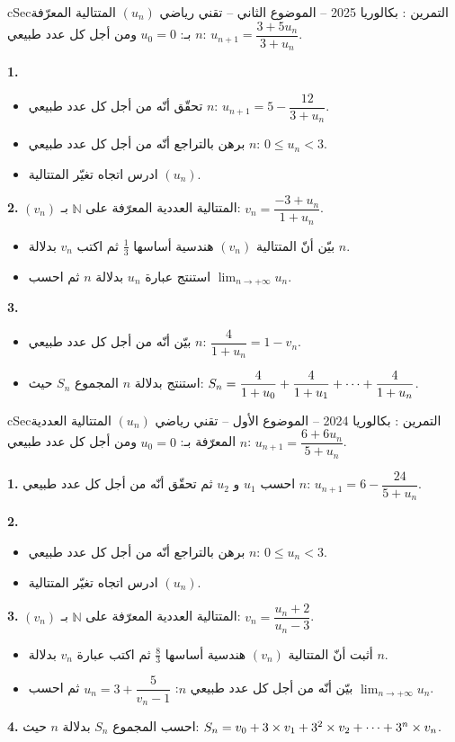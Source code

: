 \documentclass[12pt,a4paper]{article}
\newenvironment{BOX}[2]{\begin{otherlanguage}{english}\begin{arbox}{#1}{#2}}{\end{arbox}\end{otherlanguage}}
\newcounter{exo}
\newenvironment{tamrin}[1]{\stepcounter{exo}\begin{BOX}{cSec}{التمرين \theexo: #1}}{\end{BOX}}
\renewcommand{\cdots}{\mathinner{\cdotp\cdotp\cdotp}}
\newcommand{\N}{\mathbb{N}}
\newcommand{\limn}{\displaystyle\lim_{n\to+\infty}}
\newenvironment{sq}{\begin{itemize}[leftmargin=2.4em,itemsep=3pt]}{\end{itemize}}
\newcommand{\qa}{\item[(أ)]}\newcommand{\qb}{\item[(ب)]}\newcommand{\qc}{\item[(جـ)]}\newcommand{\qd}{\item[(د)]}\newcommand{\qe}{\item[(هـ)]}
\begin{document}
\begin{tamrin}{بكالوريا 2025 -- الموضوع الثاني -- تقني رياضي}
$(u_n)$ المتتالية المعرّفة بـ: $u_0=0$ ومن أجل كل عدد طبيعي $n$: $u_{n+1}=\dfrac{3+5u_n}{3+u_n}$.

\textbf{1.}
\begin{sq}
\qa تحقّق أنّه من أجل كل عدد طبيعي $n$: $u_{n+1}=5-\dfrac{12}{3+u_n}$.
\qb برهن بالتراجع أنّه من أجل كل عدد طبيعي $n$: $0\le u_n<3$.
\qc ادرس اتجاه تغيّر المتتالية $(u_n)$.
\end{sq}
\textbf{2.} $(v_n)$ المتتالية العددية المعرّفة على $\N$ بـ: $v_n=\dfrac{-3+u_n}{1+u_n}$.
\begin{sq}
\qa بيّن أنّ المتتالية $(v_n)$ هندسية أساسها $\frac13$ ثم اكتب $v_n$ بدلالة $n$.
\qb استنتج عبارة $u_n$ بدلالة $n$ ثم احسب $\limn u_n$.
\end{sq}
\textbf{3.}
\begin{sq}
\qa بيّن أنّه من أجل كل عدد طبيعي $n$: $\dfrac{4}{1+u_n}=1-v_n$.
\qb استنتج بدلالة $n$ المجموع $S_n$ حيث: $S_n=\dfrac{4}{1+u_0}+\dfrac{4}{1+u_1}+\cdots+\dfrac{4}{1+u_n}$.
\end{sq}
\end{tamrin}

\begin{tamrin}{بكالوريا 2024 -- الموضوع الأول -- تقني رياضي}
$(u_n)$ المتتالية العددية المعرّفة بـ: $u_0=0$ ومن أجل كل عدد طبيعي $n$: $u_{n+1}=\dfrac{6+6u_n}{5+u_n}$.

\textbf{1.} احسب $u_1$ و $u_2$ ثم تحقّق أنّه من أجل كل عدد طبيعي $n$: $u_{n+1}=6-\dfrac{24}{5+u_n}$.

\textbf{2.}
\begin{sq}
\qa برهن بالتراجع أنّه من أجل كل عدد طبيعي $n$: $0\le u_n<3$.
\qb ادرس اتجاه تغيّر المتتالية $(u_n)$.
\end{sq}
\textbf{3.} $(v_n)$ المتتالية العددية المعرّفة على $\N$ بـ: $v_n=\dfrac{u_n+2}{u_n-3}$.
\begin{sq}
\qa أثبت أنّ المتتالية $(v_n)$ هندسية أساسها $\frac83$ ثم اكتب عبارة $v_n$ بدلالة $n$.
\qb بيّن أنّه من أجل كل عدد طبيعي $n$: $u_n=3+\dfrac{5}{v_n-1}$ ثم احسب $\limn u_n$.
\end{sq}
\textbf{4.} احسب المجموع $S_n$ بدلالة $n$ حيث: $S_n=v_0+3\times v_1+3^2\times v_2+\cdots+3^n\times v_n$.
\end{tamrin}
\end{document}
